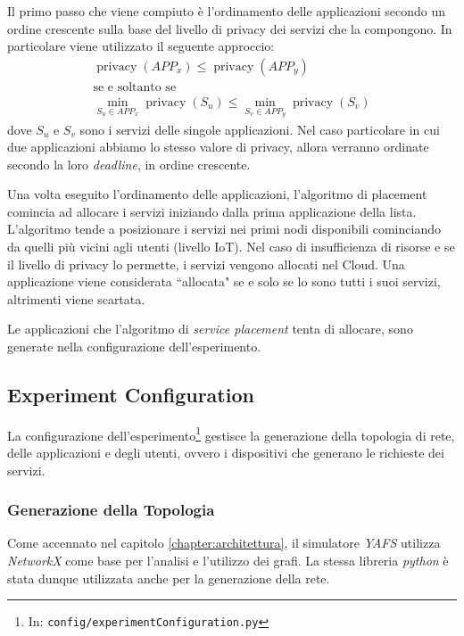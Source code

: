 Il primo passo che viene compiuto è l'ordinamento delle applicazioni secondo un ordine crescente sulla base del livello di privacy dei servizi che la compongono. In particolare viene utilizzato il seguente approccio:
\begin{equation*}  
	\begin{array}{c}

\displaystyle \operatorname{privacy}(APP_x) \leq \operatorname{privacy}(APP_y)\\
\text{se e soltanto se}\\
\displaystyle \min_{S_u \in APP_x} \operatorname{privacy}(S_u) \leq \min_{S_v \in APP_y} \operatorname{privacy}(S_v)
 	\end{array}
\end{equation*}
dove $S_u$ e $S_v$ sono i servizi delle singole applicazioni. Nel caso particolare in cui due applicazioni abbiamo lo stesso valore di privacy, allora verranno ordinate secondo la loro \textit{deadline}, in ordine crescente.

Una volta eseguito l'ordinamento delle applicazioni, l'algoritmo di placement comincia ad allocare i servizi iniziando dalla prima applicazione della lista. L'algoritmo tende a posizionare i servizi nei primi nodi disponibili cominciando da quelli più vicini agli utenti (livello IoT). Nel caso di insufficienza di risorse e se il livello di privacy lo permette, i servizi vengono allocati nel Cloud. Una applicazione viene considerata ``allocata" se e solo se lo sono tutti i suoi servizi, altrimenti viene scartata.

Le applicazioni che l'algoritmo di \textit{service placement} tenta di allocare, sono generate nella configurazione dell'esperimento.

\subsection{Experiment Configuration}

La configurazione dell'esperimento\footnote{In: \texttt{config/experimentConfiguration.py}} gestisce la generazione della topologia di rete, delle applicazioni e degli utenti, ovvero i dispositivi che generano le richieste dei servizi.

\subsubsection{Generazione della Topologia}

Come accennato nel capitolo \ref{chapter:architettura}, il simulatore \textit{YAFS} utilizza \textit{NetworkX} come base per l'analisi e l'utilizzo dei grafi. La stessa libreria \textit{python} è stata dunque utilizzata anche per la generazione della rete.


